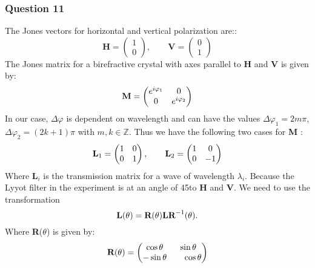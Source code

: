 \subsubsection{Question 11}
The Jones vectors for horizontal and vertical polarization are::
\begin{equation}
	\bm H = \begin{pmatrix} 1\\0 \end{pmatrix}, \qquad \bm V = \begin{pmatrix} 0\\1 \end{pmatrix} 
\end{equation}
The Jones matrix for a birefractive crystal with axes parallel to $\bm H$  and $\bm V$ is given by:
\begin{equation}
	\bf M = 
	\begin{pmatrix}
		e^{i \varphi_1} &0\\ 0 & e^{i \varphi_2}
	\end{pmatrix}
\end{equation}
In our case, $\Delta \varphi$ is dependent on wavelength and can have the values $\Delta \varphi_1 = 2 m \pi$, $\Delta \varphi_2 = (2k+1) \pi$ with $m,k\in \mathbb Z$. Thus we have the following two cases for \textbf{M} :
\begin{equation}
	\textbf L_1 = 
	\begin{pmatrix}
	1 &0\\ 0 & 1
	\end{pmatrix}, \qquad
\textbf L_2 = 
\begin{pmatrix}
	1 &0\\ 0 & -1
\end{pmatrix}
\end{equation}
Where \textbf L$_i$ is the transmission matrix for a wave of wavelength $\lambda_i$.
Because the Lyyot filter in the experiment is at an angle of 45\degree to $\bm H$ and $\bm V$. We need to use the transformation
\begin{equation}
	\textbf L (\theta)=\textbf R(\theta) \textbf L \textbf R^{-1}(\theta).
\end{equation}
Where \textbf R($\theta$) is given by:
\begin{equation}
	\textbf R (\theta)=\begin{pmatrix} \cos \theta &  \sin\theta \\ -\sin\theta & \;\;\;\;\cos\theta \end{pmatrix}	
\end{equation}

